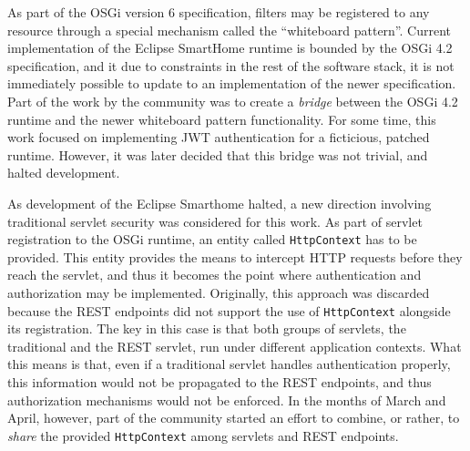 \documentclass[12pt]{article}
\begin{document}
As part of the OSGi version 6 specification, filters may be registered to any resource through a special mechanism called the ``whiteboard pattern''. Current implementation of the Eclipse SmartHome runtime is bounded by the OSGi 4.2 specification, and it due to constraints in the rest of the software stack, it is not immediately possible to update to an implementation of the newer specification. Part of the work by the community was to create a \emph{bridge} between the OSGi 4.2 runtime and the newer whiteboard pattern functionality. For some time, this work focused on implementing JWT authentication for a ficticious, patched runtime. However, it was later decided that this bridge was not trivial, and halted development.

As development of the Eclipse Smarthome halted, a new direction involving traditional servlet security was considered for this work. As part of servlet registration to the OSGi runtime, an entity called \texttt{HttpContext} has to be provided. This entity provides the means to intercept HTTP requests before they reach the servlet, and thus it becomes the point where authentication and authorization may be implemented. Originally, this approach was discarded because the REST endpoints did not support the use of \texttt{HttpContext} alongside its registration. The key in this case is that both groups of servlets, the traditional and the REST servlet, run under different application contexts. What this means is that, even if a traditional servlet handles authentication properly, this information would not be propagated to the REST endpoints, and thus authorization mechanisms would not be enforced. In the months of March and April, however, part of the community started an effort to combine, or rather, to \emph{share} the provided \texttt{HttpContext} among servlets and REST endpoints.
\end{document}
